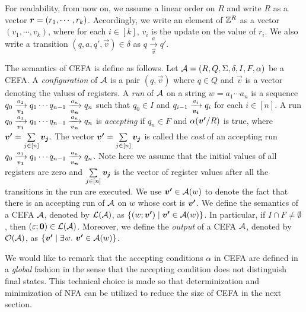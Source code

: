 For readability, from now on, we assume a linear order on $R$ and write $R$ as a vector $\myvec{r} = (r_1, \cdots, r_k)$. Accordingly, we write an element of $\mathbb{Z}^R$ as a vector $(v_1, \cdots, v_k)$, where for each $i \in [k]$, $v_i$ is the update on the value of $r_i$. We also write a transition $(q, a, q', \vec{v}) \in \delta$ as $q \xrightarrow[\vec{v}]{a} q'$.

The semantics of CEFA is define as follows. Let $\mathcal{A} = (R, Q, \Sigma, \delta, I, F, \alpha)$ be a CEFA. 
A \emph{configuration} of $\mathcal{A}$ is a pair $(q, \vec{v})$ where $q \in Q$ and $\vec{v}$ is a vector denoting the values of registers.  
A \emph{run} of $\mathcal{A}$ on a string $w = a_1 \cdots a_n$ is a sequence $q_0 \xrightarrow[\myvec{v_1}]{a_1} q_1 \cdots q_{n-1}\xrightarrow[\myvec{v_n}]{a_n} q_n$ such that $q_0 \in I$ and $q_{i-1} \xrightarrow[\myvec{v_i}]{a_i} q_i$ for each $i \in [n]$. A run $q_0 \xrightarrow[\myvec{v_1}]{a_1} q_1 \cdots q_{n-1}\xrightarrow[\myvec{v_n}]{a_n} q_n$ is \emph{accepting} if $q_n \in F$ and $\alpha(\myvec{v'}/R)$ is true, where $\myvec{v'} = \sum \limits_{j \in [n]} \myvec{v_j}$. The vector $\myvec{v'}= \sum \limits_{j \in [n]} \myvec{v_j}$ is called the \emph{cost} of an accepting run $q_0 \xrightarrow[\myvec{v_1}]{a_1} q_1 \cdots q_{n-1}\xrightarrow[\myvec{v_n}]{a_n} q_n$. Note here we assume that the initial values of all registers are zero and $\sum \limits_{j \in [n]} \myvec{v_j}$ is the vector of register values after all the transitions in the run are executed.  We use $\myvec{v'} \in \aut(w)$ to denote the fact that there is an accepting run of $\mathcal{A}$ on $w$ whose cost is $\myvec{v'}$.  
We define the semantics of a CEFA $\mathcal{A}$, denoted by $\mathcal{L}(\mathcal{A})$, as $\{(w; \myvec{v'}) \mid  \myvec{v'} \in \aut(w)\}$.  In particular, if $I \cap F \neq \emptyset$, then $(\varepsilon; \myvec{0}) \in \Lang(\aut)$. Moreover, we define the \emph{output} of a CEFA $\mathcal{A}$, denoted by $\mathcal{O}(\mathcal{A})$, as $\{\myvec{v'} \mid  \exists w.\ \myvec{v'} \in \aut(w)\}$.

We would like to remark that the accepting conditions $\alpha$ in CEFA are defined in a \emph{global} fashion in the sense that the accepting condition does not distinguish final states. This technical choice is made so that determinization and minimization of NFA can be utilized to reduce the size of CEFA in the next section. 

%

